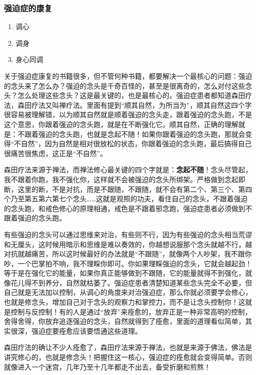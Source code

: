 \documentclass{ctexart}
\begin{document}
\subsubsection{强迫症的康复}

\begin{enumerate}
    \item 调心
    \item 调身
    \item 身心同调
\end{enumerate}

关于强迫症康复的书籍很多，但不管何种书籍，都要解决一个最核心的问题：强迫的念头来了怎么办？强迫的念头是千奇百怪的，甚至是很离奇的，怎么对付这些念头？怎么处理这些念头？这是最关键的，也是最核心的。强迫症患者都知道森田疗法，森田疗法又叫禅疗法。里面有提到“顺其自然，为所当为”，顺其自然这四个字很容易被理解错，以为顺其自然就是顺着强迫的念头走，跟着强迫的念头跑，不是这个意思，你跟着强迫的念头跑，就是在不断强化它。顺其自然，正确的理解就是：不跟着强迫的念头跑，也就是念起不随！如果你跟着强迫的念头跑，那就会变得“不自然”，因为自然是相对很放松的状态，你跟着强迫的念头跑，最后搞得自己很痛苦很焦虑，这正是“不自然”。

森田疗法来源于禅法，而禅法修心最关键的四个字就是：\textbf{念起不随}！念头尽管起，我不跟着你跑，我不强化你，这样就不会被强迫的念头所绑架。严格做到念起即断，这里的断，不是对抗，而是不跟随，不跟随，就不会有第二个、第三个、第四个乃至第五第六第七个念头……这就是观照的功夫，看住自己的念头，不跟着强迫的念头跑，和戒色修心的原理相通，戒色是不跟着邪念跑，强迫症患者必须做到不跟着强迫的念头跑。

有些强迫的念头可以通过思维来对治，有些则不行，因为有些强迫的念头相当荒谬和无厘头，这时候用暗示和思维是难以奏效的，你越想说服那个念头就越不行，越对抗就越痛苦，所以这时候最好的办法就是“不跟随”，就像两个人吵架，我不跟你吵，一个巴掌拍不响，我不理睬你即可。你如果理睬强迫的念头，它就会越起劲！等于是在强化它的能量，如果你真正能够做到不跟随，它的能量就得不到强化，就像花儿得不到养分，自然就枯萎了。强迫症患者清楚知道某些念头完全不必要，但自己就是无法加以控制，从调心的角度来对治强迫症，那么你就必须要学会修心，也就是修念头，增加自己对于念头的观察力和掌控力，而不是让念头控制你！这就是控制与反控制！有的人是通过“放弃”来痊愈的，放弃正是一种非常高明的控制，舍得舍得，你放弃追逐强迫的念头，自然就得到了痊愈，里面的道理看似简单，其实很深，强迫症要痊愈应该要悟通这些道理。

森田疗法的确让不少人痊愈了，森田疗法来源于禅法，也就是来源于佛法，佛法是讲究修心的，也就是修念头！把握住这一核心，强迫症的痊愈就会变得简单。否则就像进入一个迷宫，几年乃至十几年都走不出去，备受折磨和煎熬！
\end{document}
